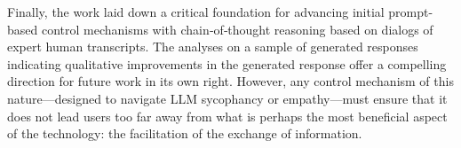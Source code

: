 \bigskip Finally, the work laid down a critical foundation for advancing initial prompt-based control mechanisms with chain‑of‑thought reasoning based on dialogs of expert human transcripts. The analyses on a sample of generated responses indicating qualitative improvements in the generated response offer a compelling direction for future work in its own right. However, any control mechanism of this nature—designed to navigate LLM sycophancy or empathy—must ensure that it does not lead users too far away from what is perhaps the most beneficial aspect of the technology: the facilitation of the exchange of information.



